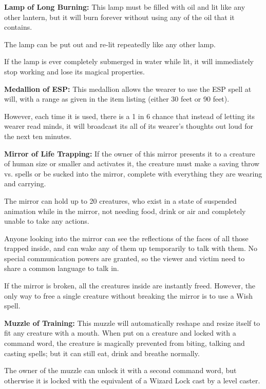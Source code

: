 \begin{multicols*}{2}
\textbf{Lamp of Long Burning:} This lamp must be filled with oil and lit like any other lantern, but it will burn forever without using any of the oil that it contains.

The lamp can be put out and re-lit repeatedly like any other lamp.

If the lamp is ever completely submerged in water while lit, it will immediately stop working and lose its magical properties.

\textbf{Medallion of ESP:} This medallion allows the wearer to use the ESP spell at will, with a range as given in the item listing (either 30 feet or 90 feet).

However, each time it is used, there is a 1 in 6 chance that instead of letting its wearer read minds, it will broadcast its all of its wearer’s thoughts out loud for the next ten minutes.

\textbf{Mirror of Life Trapping:} If the owner of this mirror presents it to a creature of human size or smaller and activates it, the creature must make a saving throw vs. spells or be sucked into the mirror, complete with everything they are wearing and carrying.

The mirror can hold up to 20 creatures, who exist in a state of suspended animation while in the mirror, not needing food, drink or air and completely unable to take any actions.

Anyone looking into the mirror can see the reflections of the faces of all those trapped inside, and can wake any of them up temporarily to talk with them. No special communication powers are granted, so the viewer and victim need to share a common language to talk in.

If the mirror is broken, all the creatures inside are instantly freed. However, the only way to free a single creature without breaking the mirror is to use a Wish spell.

\textbf{Muzzle of Training:} This muzzle will automatically reshape and resize itself to fit any creature with a mouth. When put on a creature and locked with a command word, the creature is magically prevented from biting, talking and casting spells; but it can still eat, drink and breathe normally.

The owner of the muzzle can unlock it with a second command word, but otherwise it is locked with the equivalent of a Wizard Lock cast by a  level caster.


\end{multicols*}

